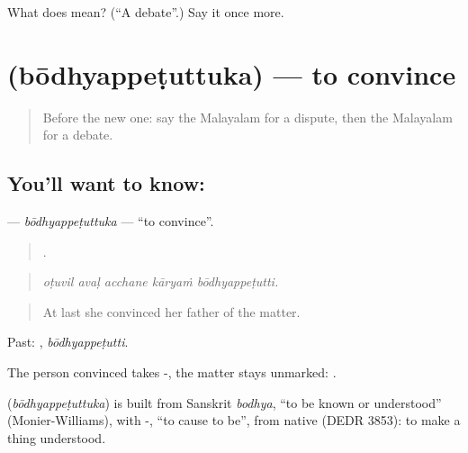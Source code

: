 \begin{tcolorbox}[breakable,colback=teal!4,colframe=teal!35!black,title={Before you move on}]
What does  mean? (\textquotedblleft{}A debate\textquotedblright{}.) Say it once more.
\end{tcolorbox}
\section[\texorpdfstring{\ml{ബോധ്യപ്പെടുത്തുക} (bōdhyappeṭuttuka)}{ബോധ്യപ്പെടുത്തുക (bōdhyappeṭuttuka)}]{ (bōdhyappeṭuttuka) — to convince}

\label{lesson:ML-C406-bodhyappetuttuka}



\begin{quote}
Before the new one: say the Malayalam for a dispute, then the Malayalam for a debate.
\end{quote}

\subsection*{You'll want to know: }
\textbf{} — \emph{bōdhyappeṭuttuka} — \textquotedblleft{}to convince\textquotedblright{}.

\begin{quote}
    .
\end{quote}

\begin{quote}
\emph{oṭuvil avaḷ acchane kāryaṁ bōdhyappeṭutti.}
\end{quote}

\begin{quote}
At last she convinced her father of the matter.
\end{quote}

Past: , \emph{bōdhyappeṭutti}.

The person convinced takes -, the matter stays unmarked:   .

\begin{cousinweb}
\textbf{} (\emph{bōdhyappeṭuttuka}) is built from Sanskrit \emph{bodhya}, \textquotedblleft{}to be known or understood\textquotedblright{} (Monier-Williams), with -, \textquotedblleft{}to cause to be\textquotedblright{}, from native  (DEDR 3853): to make a thing understood.
\end{cousinweb}

